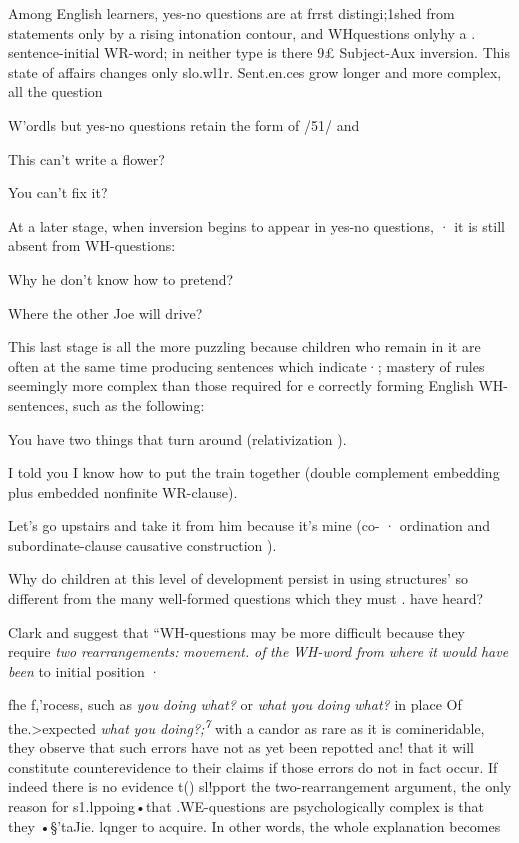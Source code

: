 Among English learners, yes-no questions are at frrst distin\-gi;1shed from statements only by a rising intonation contour, and WH\-questions onlyhy a . sentence-initial WR-word; in neither type is there 9£ Subject-Aux inversion. This state of affairs changes only slo.wl1r. Sent.en.ces grow longer and more complex, all the question

W'ordls but yes-no questions retain the form of /51/ and


\ea\label{ex:51}
 This can't write a flower?
\glt
\z

\ea\label{ex:52}
 You can't fix it?
\glt
\z

At a later stage, when inversion begins to appear in yes-no questions, · it is still absent from WH-questions:

\ea\label{ex:53}
 Why he don't know how to pretend?
\glt
\z

\ea\label{ex:54}
 Where the other Joe will drive?
\glt
\z

This last stage is all the more puzzling because children who remain in it are often at the same time producing sentences which indicate·; mastery of rules seemingly more complex than those required for e correctly forming English WH-sentences, such as the following:

\ea\label{ex:55}
 You have two things that turn around (relativization ).
\glt
\z

\ea\label{ex:56}
 I told you I know how to put the train together (double comple\-ment embedding plus embedded nonfinite WR-clause).
\glt
\z

\ea\label{ex:57}
 Let's go upstairs and take it from him because it's mine (co- · ordination and subordinate-clause causative construction ).
\glt
\z

Why do children at this level of development persist in using structures' so different from the many well-formed questions which they must . have heard?

Clark and \citet[354]{Clark1977} suggest that ``WH-questions may be more difficult because they require \textit{two} \textit{rearrangements:} \textit{movement.} \textit{of} \textit{the} \textit{WH-word} \textit{from} \textit{where} \textit{it} \textit{would} \textit{have} \textit{been} to initial position ·

fhe f,'rocess, such as \textit{you} \textit{doing} \textit{what?} or \textit{what} \textit{you} \textit{doi}\textit{n}\textit{g} \textit{what?} in place Of the.{\textgreater}expected \textit{what} \textit{you doing?;}\textit{\textsuperscript{7 }}with a candor as rare as it is comineridable, they observe that such errors have not as yet been repotted anc! that it will constitute counterevidence to their claims if those errors do not in fact occur. If indeed there is no evidence
t() sl!pport the two-rearrangement argument, the only reason for s1.lppoing•that .WE-questions are psychologically complex is that they 
•§'taJie. lqnger to acquire. In other words, the whole explanation becomes

